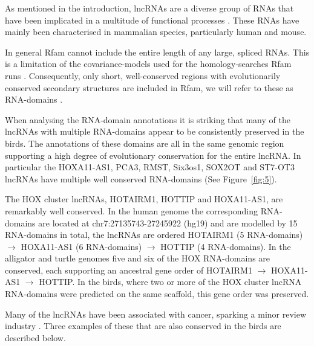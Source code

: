\documentclass[10pt]{bmc_article}
\newenvironment{bmcformat}{\begin{raggedright}\baselineskip20pt\sloppy\setboolean{publ}{false}}{\end{raggedright}\baselineskip20pt\sloppy}
\begin{document}
\begin{bmcformat}

As mentioned in the introduction, lncRNAs are a diverse group of RNAs
that have been implicated in a multitude of functional processes
\cite{Rinn:2007,Chow:2005,Guttman:2009}. These RNAs have mainly been
characterised in mammalian species, particularly human and mouse.

In general Rfam cannot include the entire length of any large, spliced
RNAs. This is a limitation of the covariance-models used for the
homology-searches Rfam runs \cite{Nawrocki:2009}. Consequently, only
short, well-conserved regions with evolutionarily conserved secondary
structures are included in Rfam, we will refer to these as RNA-domains
\cite{Burge:2013}.

When analysing the RNA-domain annotations it is striking that many of
the lncRNAs with multiple RNA-domains appear to be consistently
preserved in the birds. The annotations of these domains are all in
the same genomic region supporting a high degree of evolutionary
conservation for the entire lncRNA. In particular the HOXA11-AS1,
PCA3, RMST, Six3os1, SOX2OT and ST7-OT3 lncRNAs have multiple well
conserved RNA-domains (See Figure~\ref{fig:5}).

The HOX cluster lncRNAs, HOTAIRM1, HOTTIP and HOXA11-AS1, are
remarkably well conserved. In the human genome the corresponding
RNA-domains are located at chr7:27135743-27245922 (hg19) and are
modelled by 15 RNA-domains in total, the %
lncRNAs are ordered HOTAIRM1 (5 RNA-domains) $\rightarrow$ HOXA11-AS1
(6 RNA-domains) $\rightarrow$ HOTTIP (4 RNA-domains). In the alligator
and turtle genomes five and six of the HOX RNA-domains are conserved,
each supporting an ancestral gene order of HOTAIRM1 $\rightarrow$
HOXA11-AS1 $\rightarrow$ HOTTIP. In the birds, where two or more of
the HOX cluster lncRNA RNA-domains were predicted on the same
scaffold, this gene order was preserved.

Many of the lncRNAs have been associated with cancer, sparking a minor
review industry \cite{Prensner:2011,Spizzo:2012}. Three examples of
these that are also conserved in the birds are described below.


\end{bmcformat}
\end{document}
